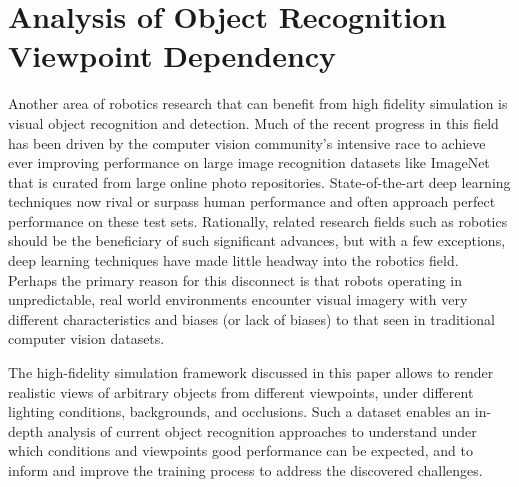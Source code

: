 \documentclass[letterpaper, 10 pt, conference]{ieeeconf}  %
\begin{document}

\section{Analysis of Object Recognition Viewpoint Dependency}

Another area of robotics research that can benefit from high fidelity simulation is visual object recognition and detection.
Much of the recent progress in this field has been driven by the computer vision community's intensive race to achieve ever improving performance on large image recognition datasets like ImageNet \cite{Russakovsky14} that is curated from large online photo repositories. State-of-the-art deep learning techniques now rival or surpass human performance and often approach perfect performance on these test sets. Rationally, related research fields such as robotics should be the beneficiary of such significant advances, but with a few exceptions, deep learning techniques have made little headway into the robotics field. Perhaps the primary reason for this disconnect is that robots operating in unpredictable, real world environments encounter visual imagery with very different characteristics and biases (or lack of biases) to that seen in traditional computer vision datasets. 


The high-fidelity simulation framework discussed in this paper allows to render realistic views of arbitrary objects from different viewpoints, under different lighting conditions, backgrounds, and occlusions. Such a dataset enables an in-depth analysis of current object recognition approaches to understand under which conditions and viewpoints good performance can be expected, and to inform and improve the training process to address the discovered challenges.
\end{document}

